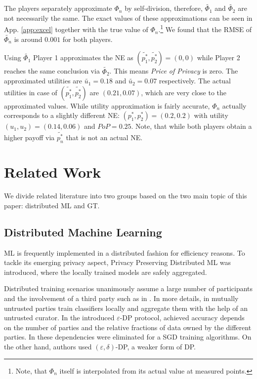 \documentclass[USenglish,oneside,twocolumn]{article}
\theoremstyle{plain}
\begin{document}
    The players separately approximate $\Phi_n$ by self-division, therefore, $\widetilde{\Phi_1}$ and $\widetilde{\Phi_2}$ are not necessarily the same. The exact values of these approximations can be seen in App. \ref{app:excel} together with the true value of $\Phi_n$.\footnote{Note, that $\Phi_n$ itself is interpolated from its actual value at measured points.} We found that the RMSE of $\widetilde{\Phi_n}$ is around $0.001$ for both players.%
    
    Using $\widetilde{\Phi_1}$ Player 1 approximates the NE as $(\widetilde{p_1^*},\widetilde{p_2^*})=(0,0)$ while Player 2 reaches the same conclusion via $\widetilde{\Phi_2}$. This means \textit{Price of Privacy} is zero. The approximated utilities are $\widetilde{u_1}=\num{0.18}$ and $\widetilde{u_2}=\num{0.07}$ respectively. The actual utilities in case of $(\widetilde{p_1^*},\widetilde{p_2^*})$ are $(0.21,0.07)$, which are very close to the approximated values. While utility approximation is fairly accurate, $\Phi_n$ actually corresponds to a slightly different NE: $(p_1^*,p_2^*)=(0.2,0.2)$ with utility $(u_1,u_2)=(0.14,0.06)$ and $PoP=0.25$. Note, that while both players obtain a higher payoff via $\widetilde{p_n^*}$ that is not an actual NE.

    \vspace{-0.5cm}
    \section{Related Work}
    \label{sec:related}
    \vspace{-0.25cm}
    
    We divide related literature into two groups based on the two main topic of this paper: distributed ML and GT.
    
    \vspace{-0.5cm}
    \subsection{Distributed Machine Learning}
    \vspace{-0.25cm}
    
    ML is frequently implemented in a distributed fashion for efficiency reasons. To tackle its emerging privacy aspect, Privacy Preserving Distributed ML was introduced, where the locally trained models are safely aggregated.
    
    Distributed training scenarios unanimously assume a large number of participants and the involvement of a third party such as in \cite{pathak2010multiparty,rajkumar2012differentially,hamm2016learning,mcmahan2016communication,pawlick2016stackelberg}. In more details, in \cite{pathak2010multiparty} mutually untrusted parties train classifiers locally and aggregate them with the help of an untrusted curator. In the introduced $\varepsilon$-DP protocol, achieved accuracy depends on the number of parties and the relative fractions of data owned by the different parties. In \cite{rajkumar2012differentially} these dependencies were eliminated for a SGD training algorithms. On the other hand, authors used $(\varepsilon,\delta)$-DP, a weaker form of DP.
    
\end{document}
